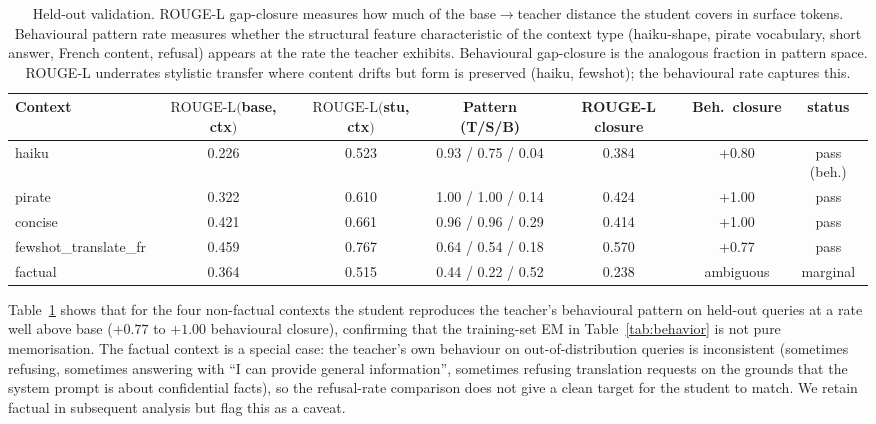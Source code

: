 \documentclass{article}
\begin{document}
\begin{table}[t]
\centering
\caption{Held-out validation. ROUGE-L gap-closure measures how much of
the base$\to$teacher distance the student covers in surface tokens.
Behavioural pattern rate measures whether the structural feature
characteristic of the context type (haiku-shape, pirate vocabulary,
short answer, French content, refusal) appears at the rate the teacher
exhibits. Behavioural gap-closure is the analogous fraction in pattern
space. ROUGE-L underrates stylistic transfer where content drifts but
form is preserved (haiku, fewshot); the behavioural rate captures this.}
\label{tab:held_out}
\small
\begin{tabular}{lcc|ccc|c}
\toprule
Context & $\text{ROUGE-L}($base, ctx$)$ & $\text{ROUGE-L}($stu, ctx$)$ &
  Pattern (T/S/B) & ROUGE-L closure & Beh.\ closure & status \\
\midrule
haiku   & 0.226 & 0.523 & 0.93 / 0.75 / 0.04 & 0.384 & +0.80 & pass (beh.) \\
pirate  & 0.322 & 0.610 & 1.00 / 1.00 / 0.14 & 0.424 & +1.00 & pass \\
concise & 0.421 & 0.661 & 0.96 / 0.96 / 0.29 & 0.414 & +1.00 & pass \\
fewshot\_translate\_fr & 0.459 & 0.767 & 0.64 / 0.54 / 0.18 & 0.570 & +0.77 & pass \\
factual & 0.364 & 0.515 & 0.44 / 0.22 / 0.52 & 0.238 & ambiguous & marginal \\
\bottomrule
\end{tabular}
\end{table}

Table~\ref{tab:held_out} shows that for the four non-factual contexts
the student reproduces the teacher's behavioural pattern on held-out
queries at a rate well above base ($+0.77$ to $+1.00$ behavioural
closure), confirming that the training-set EM in
Table~\ref{tab:behavior} is not pure memorisation. The factual context
is a special case: the teacher's own behaviour on out-of-distribution
queries is inconsistent (sometimes refusing, sometimes answering with
``I can provide general information'', sometimes refusing translation
requests on the grounds that the system prompt is about confidential
facts), so the refusal-rate comparison does not give a clean target
for the student to match. We retain factual in subsequent analysis but
flag this as a caveat.
\end{document}
